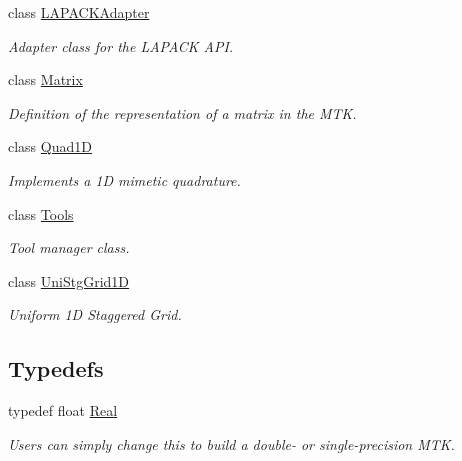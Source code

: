 \begin{DoxyCompactItemize}
class \hyperlink{classmtk_1_1LAPACKAdapter}{L\-A\-P\-A\-C\-K\-Adapter}
\begin{DoxyCompactList}\small\item\em Adapter class for the L\-A\-P\-A\-C\-K A\-P\-I. \end{DoxyCompactList}\item 
class \hyperlink{classmtk_1_1Matrix}{Matrix}
\begin{DoxyCompactList}\small\item\em Definition of the representation of a matrix in the M\-T\-K. \end{DoxyCompactList}\item 
class \hyperlink{classmtk_1_1Quad1D}{Quad1\-D}
\begin{DoxyCompactList}\small\item\em Implements a 1\-D mimetic quadrature. \end{DoxyCompactList}\item 
class \hyperlink{classmtk_1_1Tools}{Tools}
\begin{DoxyCompactList}\small\item\em Tool manager class. \end{DoxyCompactList}\item 
class \hyperlink{classmtk_1_1UniStgGrid1D}{Uni\-Stg\-Grid1\-D}
\begin{DoxyCompactList}\small\item\em Uniform 1\-D Staggered Grid. \end{DoxyCompactList}\end{DoxyCompactItemize}
\subsection*{Typedefs}
\begin{DoxyCompactItemize}
\item 
typedef float \hyperlink{group__c01-roots_gac080bbbf5cbb5502c9f00405f894857d}{Real}
\begin{DoxyCompactList}\small\item\em Users can simply change this to build a double-\/ or single-\/precision M\-T\-K. \end{DoxyCompactList}\end{DoxyCompactItemize}
